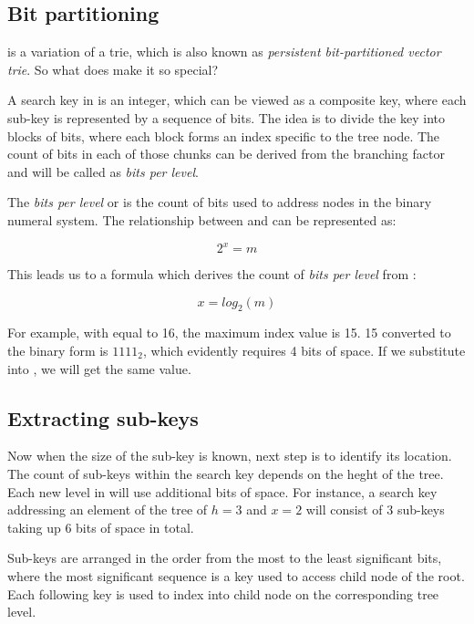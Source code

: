\subsection*{Bit partitioning}

\rbtree{} is a variation of a trie, which is also known as \emph{persistent bit-partitioned vector trie}. So what does make it so special? 

A search key in \rbtree{} is an integer, which can be viewed as a composite key, where each sub-key is represented by a sequence of bits. The idea is to divide the key into blocks of bits, where each block forms an index specific to the tree node. The count of bits in each of those chunks can be derived from the branching factor and will be called as \emph{bits per level}.

The \emph{bits per level} or \x{} is the count of bits used to address \m{} nodes in the binary numeral system. The relationship between \m{} and \x{} can be represented as: 

\begin{equation}
    2^x = m
\end{equation}

This leads us to a formula which derives the count of \emph{bits per level} from \m{}: 

\begin{equation}
    \label{eq:bits-per-level}
    x = log_2(m)
\end{equation}

For example, with \m{} equal to 16, the maximum index value is 15. 15 converted to the binary form is $1111_2$, which evidently requires 4 bits of space. If we substitute \m{} into , we will get the same value. 

\subsection*{Extracting sub-keys}

Now when the size of the sub-key is known, next step is to identify its location. The count of sub-keys within the search key depends on the heght of the tree. Each new level in \rbtree{} will use \x{} additional bits of space. For instance, a search key addressing an element of the tree of ${h = 3}$ and ${x = 2}$ will consist of 3 sub-keys taking up 6 bits of space in total.

Sub-keys are arranged in the order from the most to the least significant bits, where the most significant sequence is a key used to access child node of the root. Each following key is used to index into child node on the corresponding tree level.

